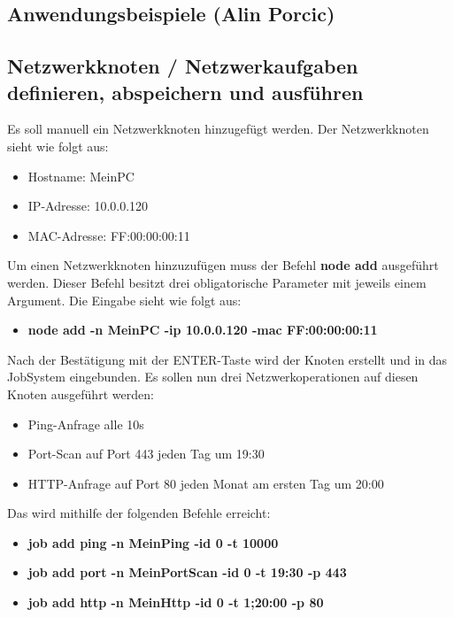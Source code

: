\documentclass[12pt,a4paper]{report}
\begin{document}
\begin{onehalfspace}
\section{Anwendungsbeispiele (Alin Porcic)}

\subsection{Netzwerkknoten / Netzwerkaufgaben definieren, abspeichern und ausführen}

Es soll manuell ein Netzwerkknoten hinzugefügt werden. Der Netzwerkknoten sieht wie folgt aus:

\begin{itemize}
  \item Hostname: MeinPC
  \item IP-Adresse: 10.0.0.120
  \item MAC-Adresse: FF:00:00:00:11
\end{itemize}

Um einen Netzwerkknoten hinzuzufügen muss der Befehl \textbf{node add} ausgeführt werden. Dieser Befehl besitzt drei obligatorische Parameter mit jeweils einem Argument. Die Eingabe sieht wie folgt aus:\\

\begin{itemize}
\item \textbf{node add -n MeinPC -ip 10.0.0.120 -mac FF:00:00:00:11}\\
\end{itemize}

Nach der Bestätigung mit der ENTER-Taste wird der Knoten erstellt und in das JobSystem eingebunden. Es sollen nun drei Netzwerkoperationen auf diesen Knoten ausgeführt werden:

\begin{itemize}
\item Ping-Anfrage alle 10s
\item Port-Scan auf Port 443 jeden Tag um 19:30
\item HTTP-Anfrage auf Port 80 jeden Monat am ersten Tag um 20:00
\end{itemize}

Das wird mithilfe der folgenden Befehle erreicht:\\

\begin{itemize}
\item \textbf{job add ping -n MeinPing -id 0 -t 10000}
\item \textbf{job add port -n MeinPortScan -id 0 -t 19:30 -p 443}
\item \textbf{job add http -n MeinHttp -id 0 -t 1;20:00 -p 80}
\end{itemize}


\end{onehalfspace}
\end{document}
